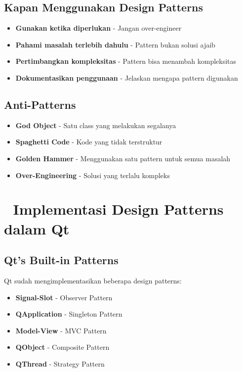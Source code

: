 \subsection{Kapan Menggunakan Design Patterns}

\begin{itemize}
\item \textbf{Gunakan ketika diperlukan} - Jangan over-engineer
\item \textbf{Pahami masalah terlebih dahulu} - Pattern bukan solusi ajaib
\item \textbf{Pertimbangkan kompleksitas} - Pattern bisa menambah kompleksitas
\item \textbf{Dokumentasikan penggunaan} - Jelaskan mengapa pattern digunakan
\end{itemize}

\subsection{Anti-Patterns}

\begin{itemize}
\item \textbf{God Object} - Satu class yang melakukan segalanya
\item \textbf{Spaghetti Code} - Kode yang tidak terstruktur
\item \textbf{Golden Hammer} - Menggunakan satu pattern untuk semua masalah
\item \textbf{Over-Engineering} - Solusi yang terlalu kompleks
\end{itemize}

\section{🔧 Implementasi Design Patterns dalam Qt}

\subsection{Qt's Built-in Patterns}

Qt sudah mengimplementasikan beberapa design patterns:

\begin{itemize}
\item \textbf{Signal-Slot} - Observer Pattern
\item \textbf{QApplication} - Singleton Pattern
\item \textbf{Model-View} - MVC Pattern
\item \textbf{QObject} - Composite Pattern
\item \textbf{QThread} - Strategy Pattern
\end{itemize}

